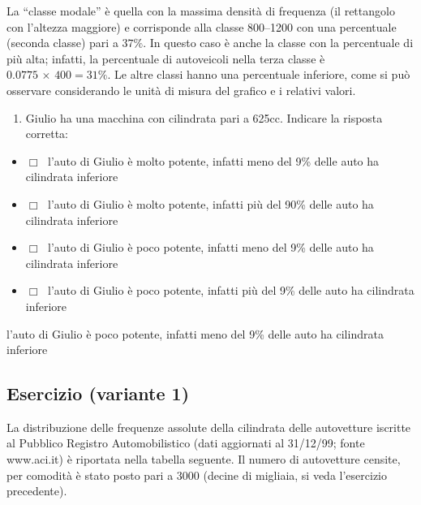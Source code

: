 \documentclass[
  11pt,
]{book}
\providecommand{\tightlist}{%
  \setlength{\itemsep}{0pt}\setlength{\parskip}{0pt}}
\theoremstyle{mytheoremstyle}
\theoremstyle{mydefstyle}
\newenvironment{sol}
  {
  \begin{tcolorbox}[enhanced,breakable,arc=0.1mm,boxrule=1pt,colback=white,colframe=iblue,
  title=\bf \fontfamily{lmss}\selectfont \hspace{.5 cm} Soluzione,drop fuzzy shadow]

}{
\end{tcolorbox}
  }
\begin{document}
\begin{sol}
La ``classe modale'' è quella con la massima densità di frequenza
(il rettangolo con l'altezza maggiore) e corrisponde alla classe
800--1200 con una percentuale (seconda classe) pari a \(37\%\).
In questo caso è anche la classe con la percentuale di più
alta; infatti, la percentuale di autoveicoli nella terza classe
è \(0.0775 \,\times\, 400 = 31\%\).
Le altre classi hanno una percentuale inferiore, come si può
osservare considerando le unità di misura del grafico e i
relativi valori.

\end{sol}

\begin{enumerate}
\def\labelenumi{\alph{enumi}.}
\setcounter{enumi}{4}
\tightlist
\item
  Giulio ha una macchina con cilindrata pari a 625cc. Indicare la risposta corretta:
\end{enumerate}

\begin{itemize}
\tightlist
\item
  \(\Box \;\) l'auto di Giulio è molto potente, infatti meno del 9\% delle auto ha cilindrata inferiore
\item
  \(\Box \;\) l'auto di Giulio è molto potente, infatti più del 90\% delle auto ha cilindrata inferiore
\item
  \(\Box \;\) l'auto di Giulio è poco potente, infatti meno del 9\% delle auto ha cilindrata inferiore
\item
  \(\Box \;\) l'auto di Giulio è poco potente, infatti più del 9\% delle auto ha cilindrata inferiore
\end{itemize}

\begin{sol}
l'auto di Giulio è poco potente, infatti meno del 9\% delle auto ha cilindrata inferiore

\end{sol}

\subsection{Esercizio (variante 1)}\label{esercizio-variante-1}

La distribuzione delle frequenze assolute della cilindrata
delle autovetture iscritte al Pubblico Registro Automobilistico
(dati aggiornati al 31/12/99; fonte www.aci.it) è riportata
nella tabella seguente.
Il numero di autovetture censite, per comodità è stato posto
pari a 3000 (decine di migliaia, si veda l'esercizio precedente).
\end{document}

